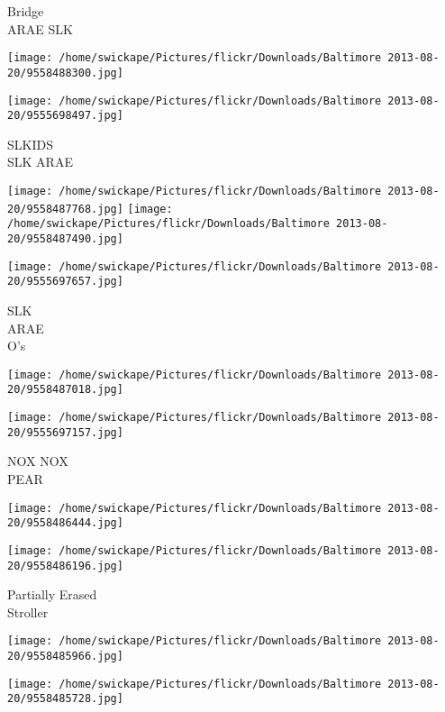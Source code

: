 \documentclass[10pt,letterpaper]{article}
\begin{document}
Bridge\\
ARAE SLK\\
\pagebreak

\texttt{[image: /home/swickape/Pictures/flickr/Downloads/Baltimore 2013-08-20/9558488300.jpg]}

\vspace{0.25in}
\texttt{[image: /home/swickape/Pictures/flickr/Downloads/Baltimore 2013-08-20/9555698497.jpg]}

SLKIDS\\
SLK ARAE\\
\pagebreak

\texttt{[image: /home/swickape/Pictures/flickr/Downloads/Baltimore 2013-08-20/9558487768.jpg]}
\texttt{[image: /home/swickape/Pictures/flickr/Downloads/Baltimore 2013-08-20/9558487490.jpg]}

\texttt{[image: /home/swickape/Pictures/flickr/Downloads/Baltimore 2013-08-20/9555697657.jpg]}

SLK\\
ARAE\\
O's\\
\pagebreak

\texttt{[image: /home/swickape/Pictures/flickr/Downloads/Baltimore 2013-08-20/9558487018.jpg]}

\vspace{0.25in}
\texttt{[image: /home/swickape/Pictures/flickr/Downloads/Baltimore 2013-08-20/9555697157.jpg]}

NOX NOX\\
PEAR\\
\pagebreak

\texttt{[image: /home/swickape/Pictures/flickr/Downloads/Baltimore 2013-08-20/9558486444.jpg]}

\vspace{0.25in}
\texttt{[image: /home/swickape/Pictures/flickr/Downloads/Baltimore 2013-08-20/9558486196.jpg]}

Partially Erased\\
Stroller\\
\pagebreak

\texttt{[image: /home/swickape/Pictures/flickr/Downloads/Baltimore 2013-08-20/9558485966.jpg]}

\vspace{0.25in}
\texttt{[image: /home/swickape/Pictures/flickr/Downloads/Baltimore 2013-08-20/9558485728.jpg]}
\end{document}

